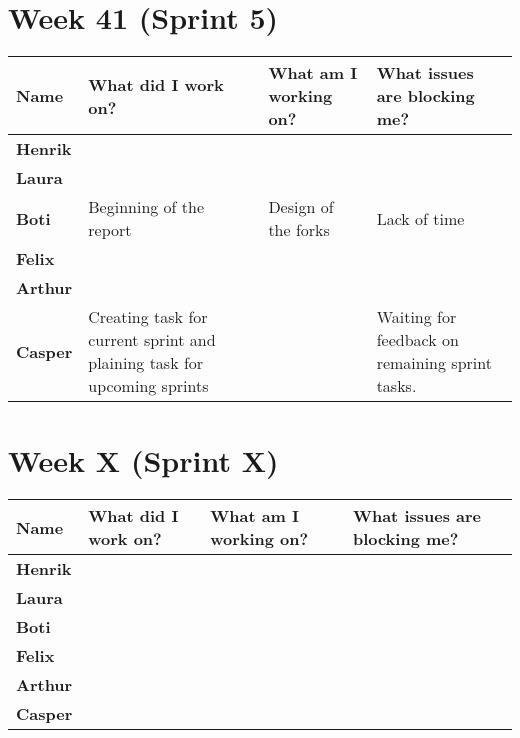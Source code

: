 \documentclass[landscape]{article}
\begin{document}
    \section{Week 41 (Sprint 5)}
    \begin{table}[H]
        \begin{center}
            \begin{tabularx}{\linewidth}{L|L|L|L}
                
                \textbf{Name} & \textbf{What did I work on?} & \textbf{What am I working on? }& \textbf{What issues are blocking me?} \\
                \hline
                \textbf{Henrik} &  &  &  \\
                \hline
                \textbf{Laura} & & & \\
                \hline
                \textbf{Boti} & Beginning of the report & Design of the forks & Lack of time \\
                \hline
                \textbf{Felix} & & & \\
                \hline
                \textbf{Arthur} & & & \\
                \hline
                \textbf{Casper} & Creating task for current sprint and plaining
                task for upcoming sprints  &  & Waiting for feedback on
                remaining sprint tasks.
            \end{tabularx}
        \end{center}
    \end{table}

    \section{Week X (Sprint X)}
    \begin{table}[H]
        \begin{center}
            \begin{tabularx}{\linewidth}{L|L|L|L}
                
                \textbf{Name} & \textbf{What did I work on?} & \textbf{What am I working on? }& \textbf{What issues are blocking me?} \\
                \hline
                \textbf{Henrik} &  &  &  \\
                \hline
                \textbf{Laura} & & & \\
                \hline
                \textbf{Boti} & & & \\
                \hline
                \textbf{Felix} & & & \\
                \hline
                \textbf{Arthur} & & & \\
                \hline
                \textbf{Casper} &  &  & 
            \end{tabularx}
        \end{center}
    \end{table}
\end{document}
